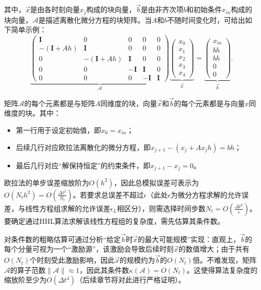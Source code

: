 \documentclass{article}
\theoremstyle{definition}
\begin{document}
其中，\(\vec{x}\)是由各时刻向量\(x_j\)构成的块向量，\(\vec{b}\)是由非齐次项\(b\)和初始条件\(x_{in}\)构成的块向量，\(\mathcal{A}\)是描述离散化微分方程的块矩阵。当\(A\)和\(b\)不随时间变化时，可给出如下简单示例：
\[
\underbrace{\begin{pmatrix}
\mathbf{I} & 0 & 0 & 0 & 0 \\
-(\mathbf{I} + Ah) & \mathbf{I} & 0 & 0 & 0 \\
0 & -(\mathbf{I} + Ah) & \mathbf{I} & 0 & 0 \\
0 & 0 & -\mathbf{I} & \mathbf{I} & 0 \\
0 & 0 & 0 & -\mathbf{I} & \mathbf{I}
\end{pmatrix}}_{\mathcal{A}} 
\underbrace{\begin{pmatrix}
x_0 \\
x_1 \\
x_2 \\
x_3 \\
x_4
\end{pmatrix}}_{\vec{x}} 
= 
\underbrace{\begin{pmatrix}
x_{in} \\
bh \\
bh \\
0 \\
0
\end{pmatrix}}_{\vec{b}}. 
\]

矩阵\(\mathcal{A}\)的每个元素都是与矩阵\(A\)同维度的块，向量\(\vec{x}\)和\(\vec{b}\)的每个元素都是与向量\(x\)同维度的块。其中：
\begin{itemize}
    \item 第一行用于设定初始值，即\(x_0 = x_{in}\)；
    \item 后续几行对应欧拉法离散化的微分方程，即\(x_{j+1} - (x_j + A x_j h) = bh\)；
    \item 最后几行对应“解保持恒定”的约束条件，即\(x_{j+1} - x_j = 0\)。
\end{itemize}

欧拉法的单步误差缩放阶为\(O(h^2)\)，因此总模拟误差可表示为\(O(N_t h^2) = O\left(\frac{\Delta t^2}{N_t}\right)\)。若要求总误差不超过\(\epsilon\)（此处\(\epsilon\)为微分方程求解的允许误差，与线性方程组求解的允许误差\(\epsilon_L\)相区分），则需选择时间步数\(N_t = O\left(\frac{\Delta t^2}{\epsilon}\right)\)。要确定通过HHL算法求解该线性方程组的复杂度，需先估算其条件数。

对条件数的粗略估算可通过分析“给定\(\vec{b}\)时\(\vec{x}\)的最大可能规模”实现：直观上，\(\vec{b}\)的每个分量可视为一个“激励源”，该激励会导致后续时刻\(\vec{x}\)的数值增大；由于共有\(O(N_t)\)个时刻受此激励影响，因此\(\vec{x}\)的规模约为\(\vec{b}\)的\(O(N_t)\)倍。不难发现，矩阵\(\mathcal{A}\)的算子范数\(\|\mathcal{A}\| \approx 1\)，因此其条件数\(\kappa(\mathcal{A}) = O(N_t)\)。这使得算法复杂度的缩放阶至少为\(O(\Delta t^4)\)（后续章节将对此进行严格证明）。
\end{document}
